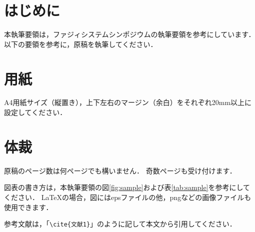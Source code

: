 \documentclass[a4paper,10pt,twocolumn]{myjarticle2}
\begin{document}


\section{はじめに}
本執筆要領は，ファジィシステムシンポジウムの執筆要領を参考にしています．
以下の要領を参考に，原稿を執筆してください．

\section{用紙}
A4用紙サイズ（縦置き），上下左右のマージン（余白）をそれぞれ20mm以上に設定してください．

\section{体裁}
原稿のページ数は何ページでも構いません．
奇数ページも受け付けます．

図表の書き方は，本執筆要領の図\ref{fig:sample}および表\ref{tab:sample}を参考にしてください．
\LaTeX の場合，図にはepsファイルの他，pngなどの画像ファイルも使用できます．

参考文献\cite{文献1}は，「\verb#\cite{文献1}#」のように記して本文から引用してください．
\end{document}
